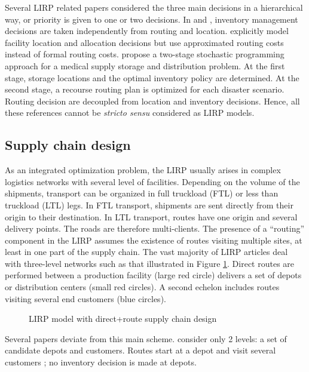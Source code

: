 \documentclass[a4paper,10pt]{article}
\begin{document}
\begin{linenumbers}
Several LIRP related papers considered the three main decisions in a hierarchical way, or priority is given to one or two decisions. 
In \cite{LiuLee03} and \cite{LiuLin05}, inventory management decisions are taken independently from routing and location. 
\cite{Shen07} explicitly model facility location and allocation decisions but use approximated routing costs instead of formal routing costs. 
\cite{MetZab10} propose a two-stage stochastic programming approach for a medical supply
storage and distribution problem.
At the first stage, storage locations and the optimal inventory policy are determined. 
At the second stage, a recourse routing plan is optimized for each disaster scenario. 
Routing decision are decoupled from location and inventory decisions. 
Hence, all these references cannot be \textit{stricto sensu} considered as LIRP models. 

\subsection{Supply chain design}
\label{sec:l} 

As an integrated optimization problem, the LIRP usually arises in complex logistics networks with several level of facilities. 
Depending on the volume of the shipments, transport can be organized in full truckload (FTL) or less than truckload (LTL) legs. 
In FTL transport, shipments are sent directly from their origin to their destination. In LTL transport, routes have one origin and several delivery points. The roads are therefore multi-clients. The presence of a ``routing'' component in the LIRP assumes the existence of routes visiting multiple sites, at least in one part of the supply chain.
The vast majority of LIRP articles deal with three-level networks such as that illustrated in Figure \ref{fig:directloop}. 
Direct routes are performed between a production facility (large red circle) delivers a set of depots or distribution centers (small red circles). A second echelon includes routes visiting several end customers (blue circles).

\begin{figure}[htbp]
	\centering
	\caption{LIRP model with direct+route supply chain design}
		\label{fig:directloop}
	\end{figure}

Several papers deviate from this main scheme.  \cite{Zhang2014} consider only 2 levels: a set of candidate depots and customers. Routes start at a depot and visit several customers ; no inventory decision is made at depots. 


\end{linenumbers}
\end{document}
